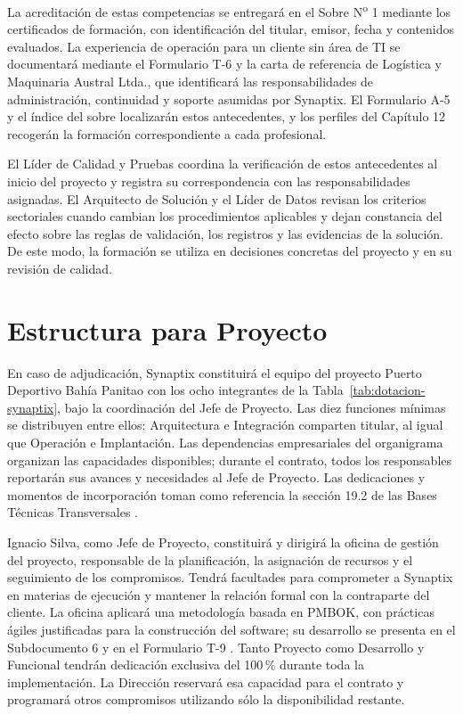 La acreditación de estas competencias se entregará en el Sobre N\textsuperscript{o} 1 mediante los certificados de formación, con identificación del titular, emisor, fecha y contenidos evaluados. La experiencia de operación para un cliente sin área de TI se documentará mediante el Formulario T-6 y la carta de referencia de Logística y Maquinaria Austral Ltda., que identificará las responsabilidades de administración, continuidad y soporte asumidas por Synaptix. El Formulario A-5 y el índice del sobre localizarán estos antecedentes, y los perfiles del Capítulo 12 recogerán la formación correspondiente a cada profesional.

El Líder de Calidad y Pruebas coordina la verificación de estos antecedentes al inicio del proyecto y registra su correspondencia con las responsabilidades asignadas. El Arquitecto de Solución y el Líder de Datos revisan los criterios sectoriales cuando cambian los procedimientos aplicables y dejan constancia del efecto sobre las reglas de validación, los registros y las evidencias de la solución. De este modo, la formación se utiliza en decisiones concretas del proyecto y en su revisión de calidad.


\section{Estructura para Proyecto}

En caso de adjudicación, Synaptix constituirá el equipo del proyecto Puerto Deportivo Bahía Panitao con los ocho integrantes de la Tabla~\ref{tab:dotacion-synaptix}, bajo la coordinación del Jefe de Proyecto. Las diez funciones mínimas se distribuyen entre ellos: Arquitectura e Integración comparten titular, al igual que Operación e Implantación. Las dependencias empresariales del organigrama organizan las capacidades disponibles; durante el contrato, todos los responsables reportarán sus avances y necesidades al Jefe de Proyecto. Las dedicaciones y momentos de incorporación toman como referencia la sección 19.2 de las Bases Técnicas Transversales \parencite[sec.~19.2, pp.~33--34]{bases-transversales}.

Ignacio Silva, como Jefe de Proyecto, constituirá y dirigirá la oficina de gestión del proyecto, responsable de la planificación, la asignación de recursos y el seguimiento de los compromisos. Tendrá facultades para comprometer a Synaptix en materias de ejecución y mantener la relación formal con la contraparte del cliente. La oficina aplicará una metodología basada en PMBOK, con prácticas ágiles justificadas para la construcción del software; su desarrollo se presenta en el Subdocumento 6 y en el Formulario T-9 \parencite[RT-19.01 y RT-19.02, p.~33]{bases-transversales}. Tanto Proyecto como Desarrollo y Funcional tendrán dedicación exclusiva del 100\,\% durante toda la implementación. La Dirección reservará esa capacidad para el contrato y programará otros compromisos utilizando sólo la disponibilidad restante.

